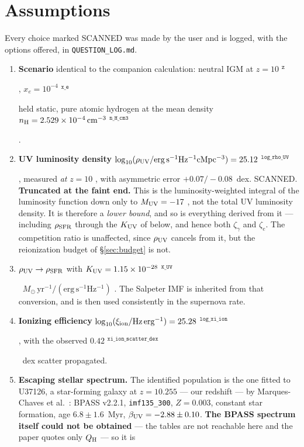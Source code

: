\documentclass[11pt,a4paper]{article}
\newif\ifprovdraft
\newcommand{\src}[1]{%
  \ifprovdraft
    \ifmmode{}^{\text{\color{gray}\scriptsize\texttt{#1}}}%
    \else{\color{gray}\scriptsize$^{\texttt{#1}}$}%
    \fi
  \fi}
\begin{document}
\section{Assumptions}
Every choice marked SCANNED was made by the user and is logged, with the options
offered, in \texttt{QUESTION\_LOG.md}.
\begin{enumerate}\itemsep2pt
\item \textbf{Scenario} identical to the companion calculation: neutral IGM at
      $z=10$\src{z}, $x_e = 10^{-4}$\src{x\_e} held static, pure atomic hydrogen
      at the mean density $n_{\rm H} = \SI{2.529e-4}{\per\cubic\centi\metre}$\src{n\_H\_cm3}.
\item \textbf{UV luminosity density} $\log_{10}(\rho_{\rm UV}/\mathrm{erg\,s^{-1}
      Hz^{-1}cMpc^{-3}}) = 25.12$\src{log\_rho\_UV}, measured \emph{at} $z=10$
      \cite{donnan24}, with asymmetric error $+0.07/-0.08$~dex. SCANNED.
      \textbf{Truncated at the faint end.} This is the luminosity-weighted
      integral of the luminosity function down only to $M_{\rm UV}=-17$
      \cite{donnan24}, not the total UV luminosity density. It is therefore a
      \emph{lower bound}, and so is everything derived from it --- including
      $\rho_{\rm SFR}$ through the $K_{\rm UV}$ of \cite{md14} below, and hence
      both $\zeta_\gamma$ and $\zeta_e$. The competition ratio is unaffected,
      since $\rho_{\rm UV}$ cancels from it, but the reionization budget of
      \S\ref{sec:budget} is not.
\item \textbf{$\rho_{\rm UV}\to\rho_{\rm SFR}$} with
      $K_{\rm UV} = 1.15\times10^{-28}$\src{K\_UV}~$M_\odot\,\mathrm{yr^{-1}}/
      (\mathrm{erg\,s^{-1}Hz^{-1}})$ \cite{md14}. The Salpeter IMF is inherited
      from that conversion, and is then used consistently in the supernova rate.
\item \textbf{Ionizing efficiency} $\log_{10}(\xi_{\rm ion}/\mathrm{Hz\,erg^{-1}})
      = 25.28$\src{log\_xi\_ion} \cite{llerena25}, with the observed
      $0.42$\src{xi\_ion\_scatter\_dex}~dex scatter propagated.
\item \textbf{Escaping stellar spectrum.} The identified population is the
      one fitted to U37126, a star-forming galaxy at $z = 10.255$ --- our
      redshift --- by Marques-Chaves et al.~\cite{mc26}: BPASS v2.2.1,
      \texttt{imf135\_300}, $Z = 0.003$, constant star formation, age
      $6.8\pm1.6$~Myr, $\beta_{\rm UV} = -2.88\pm0.10$.
      \textbf{The BPASS spectrum itself could not be obtained} --- the tables are
      not reachable here and the paper quotes only $Q_{\rm H}$ --- so it is

\end{enumerate}
\end{document}
